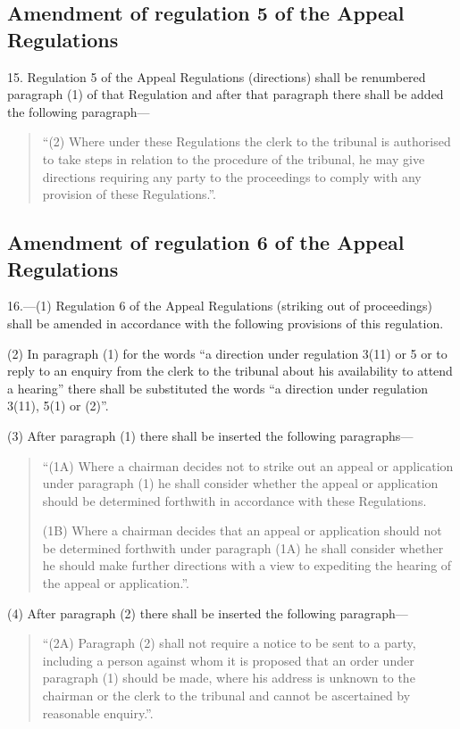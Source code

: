 \documentclass[12pt,a4paper]{article}
\begin{document}
\subsection[15. Amendment of regulation 5 of the Appeal Regulations]{Amendment of regulation 5 of the Appeal Regulations}

15.  Regulation 5 of the Appeal Regulations (directions) shall be renumbered paragraph (1) of that Regulation and after that paragraph there shall be added the following paragraph—
\begin{quotation}
“(2) Where under these Regulations the clerk to the tribunal is authorised to take steps in relation to the procedure of the tribunal, he may give directions requiring any party to the proceedings to comply with any provision of these Regulations.”.
\end{quotation}

\subsection[16. Amendment of regulation 6 of the Appeal Regulations]{Amendment of regulation 6 of the Appeal Regulations}

16.—(1) Regulation 6 of the Appeal Regulations (striking out of proceedings) shall be amended in accordance with the following provisions of this regulation.

(2) In paragraph (1) for the words “a direction under regulation 3(11) or 5 or to reply to an enquiry from the clerk to the tribunal about his availability to attend a hearing” there shall be substituted the words “a direction under regulation 3(11), 5(1) or (2)”.

(3) After paragraph (1) there shall be inserted the following paragraphs—
\begin{quotation}
“(1A) Where a chairman decides not to strike out an appeal or application under paragraph (1) he shall consider whether the appeal or application should be determined forthwith in accordance with these Regulations.

(1B) Where a chairman decides that an appeal or application should not be determined forthwith under paragraph (1A) he shall consider whether he should make further directions with a view to expediting the hearing of the appeal or application.”.
\end{quotation}

(4) After paragraph (2) there shall be inserted the following paragraph—
\begin{quotation}
“(2A) Paragraph (2) shall not require a notice to be sent to a party, including a person against whom it is proposed that an order under paragraph (1) should be made, where his address is unknown to the chairman or the clerk to the tribunal and cannot be ascertained by reasonable enquiry.”.
\end{quotation}
\end{document}
